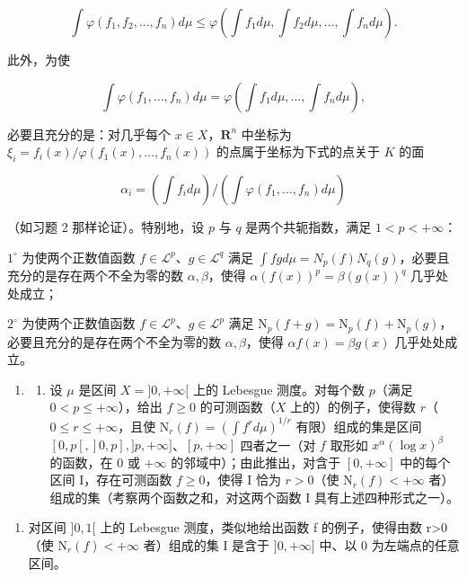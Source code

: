 \[
\int \varphi (f _ {1}, f _ {2}, \dots , f _ {n}) d \mu \leqslant \varphi (\int f _ {1} d \mu , \int f _ {2} d \mu , \dots , \int f _ {n} d \mu).
\]

此外，为使

\[
\int \varphi (f _ {1}, \dots , f _ {n}) d \mu = \varphi (\int f _ {1} d \mu , \dots , \int f _ {n} d \mu),
\]

必要且充分的是：对几乎每个 \(x \in X\)，\(\mathbf{R}^n\) 中坐标为 \(\xi_i = f_i(x) / \varphi(f_1(x), \ldots, f_n(x))\) 的点属于坐标为下式的点关于 \(K\) 的面

\[
\alpha_ {i} = (\int f _ {i} d \mu) / (\int \varphi (f _ {1}, \dots , f _ {n}) d \mu)
\]

（如习题 2 那样论证）。特别地，设 \(p\) 与 \(q\) 是两个共轭指数，满足 \(1 < p < +\infty\)：

\(1^{\circ}\) 为使两个正数值函数 \(f \in \mathcal{L}^{p}\)、\(g \in \mathcal{L}^{q}\) 满足 \(\int fg d\mu = N_{p}(f)N_{q}(g)\)，必要且充分的是存在两个不全为零的数 \(\alpha, \beta\)，使得 \(\alpha(f(x))^{p} = \beta(g(x))^{q}\) 几乎处处成立；

\(2^{\circ}\) 为使两个正数值函数 \(f \in \mathcal{L}^{p}\)、\(g \in \mathcal{L}^{p}\) 满足 \(\mathrm{N}_{p}(f + g) = \mathrm{N}_{p}(f) + \mathrm{N}_{p}(g)\)，必要且充分的是存在两个不全为零的数 \(\alpha, \beta\)，使得 \(\alpha f(x) = \beta g(x)\) 几乎处处成立。

\begin{enumerate}
\def\labelenumi{\arabic{enumi})}
\setcounter{enumi}{4}
\tightlist
\item
  \begin{enumerate}
  \def\labelenumii{\alph{enumii})}
  \tightlist
  \item
    设 \(\mu\) 是区间 \(X = ]0, +\infty[\) 上的 Lebesgue 测度。对每个数 \(p\)（满足 \(0 < p \leqslant +\infty\)），给出 \(f \geqslant 0\) 的可测函数（\(X\) 上的）的例子，使得数 \(r\)（\(0 \leqslant r \leqslant +\infty\)，且使 \(\mathrm{N}_r(f) = (\int f^r d\mu)^{1/r}\) 有限）组成的集是区间 \([0, p[, ]0, p], ]p, +\infty]\)、\([p, +\infty]\) 四者之一（对 \(f\) 取形如 \(x^\alpha(\log x)^\beta\) 的函数，在 \(0\) 或 \(+\infty\) 的邻域中）；由此推出，对含于 \([0, +\infty]\) 中的每个区间 I，存在可测函数 \(f \geqslant 0\)，使得 I 恰为 \(r > 0\)（使 \(\mathrm{N}_r(f) < +\infty\) 者）组成的集（考察两个函数之和，对这两个函数 I 具有上述四种形式之一）。
  \end{enumerate}
\end{enumerate}

\begin{enumerate}
\def\labelenumi{\alph{enumi})}
\setcounter{enumi}{1}
\tightlist
\item
  对区间 \(]0,1[\) 上的 Lebesgue 测度，类似地给出函数 f 的例子，使得由数 r\textgreater0（使 \(\mathrm{N}_{r}(f)<+\infty\) 者）组成的集 I 是含于 \(]0,+\infty]\) 中、以 0 为左端点的任意区间。
\end{enumerate}

